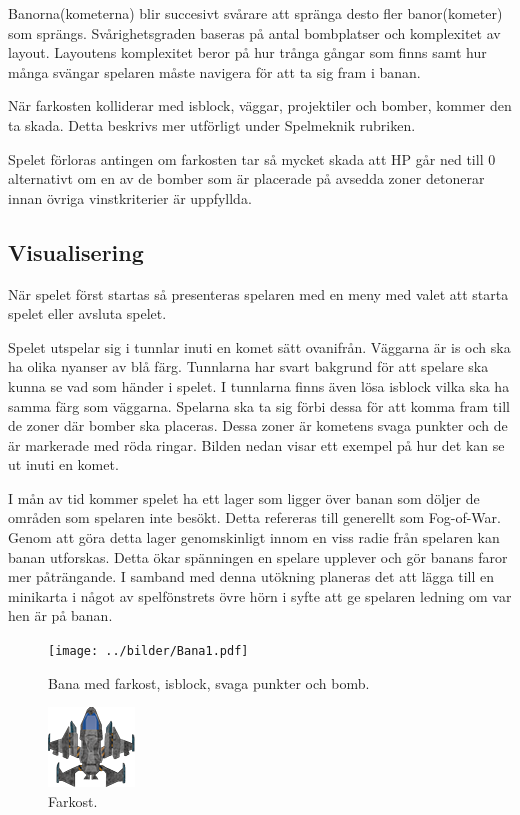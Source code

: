 \documentclass{TDP005mall}
\begin{document}
Banorna(kometerna) blir succesivt svårare att spränga desto fler banor(kometer)
som sprängs. Svårighetsgraden baseras på antal bombplatser och komplexitet av
layout. Layoutens komplexitet beror på hur trånga gångar som finns samt hur
många svängar spelaren måste navigera för att ta sig fram i banan.

När farkosten kolliderar med isblock, väggar, projektiler och bomber, kommer den
ta skada. Detta beskrivs mer utförligt under Spelmeknik rubriken.

Spelet förloras antingen om farkosten tar så mycket skada att HP
går ned till 0 alternativt om en av de bomber som är placerade på avsedda zoner
detonerar innan övriga vinstkriterier är uppfyllda.  

\pagebreak

\subsection{Visualisering}
När spelet först startas så presenteras spelaren med en meny med valet att
starta spelet eller avsluta spelet.

Spelet utspelar sig i tunnlar inuti en komet sätt ovanifrån. Väggarna är is och
ska ha olika nyanser av blå färg. Tunnlarna  har svart bakgrund för att spelare
ska kunna se vad som händer i spelet. I tunnlarna finns även lösa isblock vilka
ska ha samma färg som väggarna. Spelarna ska ta sig förbi dessa för att komma
fram till de zoner där bomber ska placeras. Dessa zoner är kometens svaga
punkter och de är markerade med röda ringar. Bilden nedan visar ett exempel på
hur det kan se ut inuti en komet.

I mån av tid kommer spelet ha ett lager som ligger över banan som döljer de
områden som spelaren inte besökt. Detta refereras till generellt som Fog-of-War.
Genom att göra detta lager genomskinligt innom en viss radie från spelaren kan
banan utforskas. Detta ökar spänningen en spelare upplever och gör banans
faror mer påträngande. I samband med denna utökning planeras det att lägga till 
en minikarta i något av spelfönstrets övre hörn i syfte att ge spelaren ledning
om var hen är på banan.

\begin{figure}[h!]
\caption{Bana med farkost, isblock, svaga punkter och bomb.}
\texttt{[image: ../bilder/Bana1.pdf]}
\end{figure}

\begin{figure}[h!]
  \caption{Farkost.}
  \center
\includegraphics[scale=1.5]{../bilder/Ship/ship0.png}
\end{figure}
\end{document}
